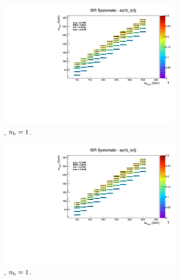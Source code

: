 \begin{figure}[ht!]
\begin{subfigure}[b]{0.32\textwidth}
    \includegraphics[width=\textwidth, page=8]{Figs/sms/t2cc/v37_2/systs/T2cc_ISR_eq1b_le3j.pdf}
    \caption{\njlow, $n_{\text{b}} = 1$.}
  \end{subfigure}
  \begin{subfigure}[b]{0.32\textwidth}
    \includegraphics[width=\textwidth, page=1]{Figs/sms/t2cc/v37_2/systs/T2cc_ISR_eq1b_le3j.pdf}
    \caption{\njlow, $n_{\text{b}} = 1$.}
  \end{subfigure}\\
  \begin{subfigure}[b]{0.32\textwidth}

\end{subfigure}
\end{figure}
